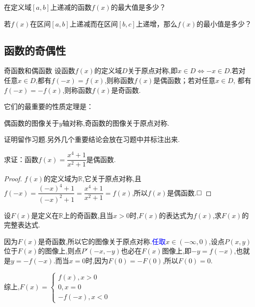 \documentclass[lang=cn,math=cm,chinesefont=nofont,11pt,scheme=chinese,twocol]{elegantbook}
\begin{document}
\begin{exercise}
  在定义域$[a,b]$上递减的函数$f(x)$的最大值是多少？
\end{exercise}

\begin{exercise}
  若$f(x)$在区间$[a,b]$上递减而在区间$[b,c]$上递增，那么$f(x)$的最小值是多少？
\end{exercise}

\subsection{函数的奇偶性}

\begin{definition}{奇函数和偶函数}
  设函数$f(x)$的定义域$D$关于原点对称,即$x\in D\Leftrightarrow-x\in D$.若对任意$x\in D$,都有$f(-x)=f(x)$,则称函数$f(x)$是偶函数；若对任意$x\in D$, 都有$f(-x)=-f(x)$,则称函数$f(x)$是奇函数.
\end{definition}

它们的最重要的性质定理是：

\begin{property}
  偶函数的图像关于$y$轴对称,奇函数的图像关于原点对称.
\end{property}

证明留作习题.另外几个重要结论会放在习题中并标注出来.

\begin{example}
  求证：函数$f(x)=\dfrac{x^{4}+1}{x^{2}+1}$是偶函数.
\end{example}

\begin{proof}
  $f(x)$的定义域为$\mathbb{R}$,它关于原点对称,且$f(-x)=\dfrac{(-x)^{4}+1}{(-x)^{2}+1}=\dfrac{x^{4}+1}{x^{2}+1}=f(x)$,所以$f(x)$是偶函数.$\hfill\square$
\end{proof}

\begin{example}
  设$F(x)$是定义在$\mathbb{R}$上的奇函数,且当$x>0$时,$F(x)$的表达式为$f(x)$,求$F(x)$的完整表达式.
\end{example}

\begin{solution}
  因为$F(x)$是奇函数,所以它的图像关于原点对称.\textcolor{blue}{任取}$x\in(-\infty,0)$,设点$P(x,y)$位于$F(x)$的图像上,则点$P'(-x,-y)$也必在$F(x)$图像上,即$-y=f(-x)$,也就是$y=-f(-x)$.而当$x=0$时,因为$F(0)=-F(0)$,所以$F(0)=0$.

  综上,$F(x)=
  \begin{cases}
    f(x),x>0
    \\0,x=0
    \\-f(-x),x<0
  \end{cases}$
\end{solution}
\end{document}
